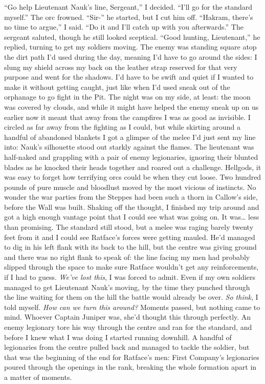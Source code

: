 \documentclass[12pt, openany]{book}
\begin{document}
“Go help Lieutenant Nauk’s line, Sergeant,” I decided. “I’ll go for the standard myself.”
The orc frowned.
“Sir-” he started, but I cut him off.
“Hakram, there’s no time to argue,” I said. “Do it and I’ll catch up with you afterwards.”
The sergeant saluted, though he still looked sceptical.
“Good hunting, Lieutenant,” he replied, turning to get my soldiers moving.
The enemy was standing square atop the dirt path I’d used during the day, meaning I’d have to go around the sides: I slung my shield across my back on the leather strap reserved for that very purpose and went for the shadows. I’d have to be swift and quiet if I wanted to make it without getting caught, just like when I’d used sneak out of the orphanage to go fight in the Pit. The night was on my side, at least: the moon was covered by clouds, and while it might have helped the enemy sneak up on us earlier now it meant that away from the campfires I was as good as invisible. I circled as far away from the fighting as I could, but while skirting around a handful of abandoned blankets I got a glimpse of the melee I’d just sent my line into: Nauk’s silhouette stood out starkly against the flames. The lieutenant was half-naked and grappling with a pair of enemy legionaries, ignoring their blunted blades as he knocked their heads together and roared out a challenge. Hellgods, it was easy to forget how terrifying orcs could be when they cut loose. Two hundred pounds of pure muscle and bloodlust moved by the most vicious of instincts. No wonder the war parties from the Steppes had been such a thorn in Callow’s side, before the Wall was built. Shaking off the thought, I finished my trip around and got a high enough vantage point that I could see what was going on.
It was… less than promising. The standard still stood, but a melee was raging barely twenty feet from it and I could see Ratface’s forces were getting mauled. He’d managed to dig in his left flank with its back to the hill, but the centre was giving ground and there was no right flank to speak of: the line facing my men had probably slipped through the space to make sure Ratface wouldn’t get any reinforcements, if I had to guess. \textit{We’ve lost this}, I was forced to admit. Even if my own soldiers managed to get Lieutenant Nauk’s moving, by the time they punched through the line waiting for them on the hill the battle would already be over. \textit{So think}, I told myself. \textit{How can we turn this around?} Moments passed, but nothing came to mind. Whoever Captain Juniper was, she’d thought this through perfectly. An enemy legionary tore his way through the centre and ran for the standard, and before I knew what I was doing I started running downhill. A handful of legionaries from the centre pulled back and managed to tackle the soldier, but that was the beginning of the end for Ratface’s men: First Company’s legionaries poured through the openings in the rank, breaking the whole formation apart in a matter of moments.
\end{document}
